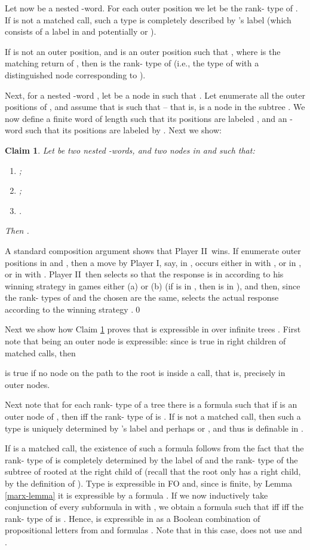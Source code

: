 \documentclass{LMCS}
\newcommand{\dupl}{Player II}
\newcommand{\spoiler}{Player I}
\newcommand{\sProof}[1]{\vspace{2mm}{\noindent\em Proof.~}#1\qed}
\theoremstyle{plain}
\newtheorem{claim}[theorem]{Claim}
\theoremstyle{definition}
\begin{document}
{Let  now be a nested -word. For each outer position 
we let  be the rank- type of . If  is not
a matched call, such a type is completely described by 's label
(which consists of a label in  and potentially  or
). 

If  is not
an outer position, and  is an outer position such that , where  is the matching return of , then  is
the rank- type of  (i.e., the type of
 with a distinguished node corresponding to ).

Next, for a nested -word , let  be a node in 
such that . Let  enumerate all the outer
positions of , and assume that  is such that  -- that is,  is a node in the subtree . We
now define a finite word  of length  such that
its positions  are labeled , and an -word  such that
its positions  are labeled by . Next we show:

\begin{claim}
\label{nwtl-comp-claim}
Let  be two nested -words, and 
two nodes in  and  such that:
\begin{enumerate}[\em(a)]
\item ;
\item ;
\item .
\end{enumerate}
Then .
\end{claim}

\sProof{A standard composition argument shows that \dupl\ wins. If 
enumerate outer positions in  and , then a
move by \spoiler, say, in , occurs either in  with
, or in , or in  with . \dupl\
then selects  so that the response is in  according
to his winning strategy in games either (a) or (b) (if  is in
, then  is in ), and then, since the
rank- types of  and the chosen  are the same,
selects the actual response according to the winning strategy
.}

Next we show how Claim \ref{nwtl-comp-claim} proves that  is
expressible in  over infinite trees . 
First note that being an outer node is expressible: since  is
true in right children of matched calls, then 

is true if no node on the path to the root is inside a call, that is,
precisely in outer nodes. 

Next note that for each rank- type  of a tree there is a 
formula  such that if  is an outer node of
, then  iff the rank- type of
 is . If  is not a matched call, then such a type is
uniquely determined by 's label and perhaps  or ,
and thus is definable in . 

If  is a matched call, the existence of such a formula  
follows from the fact that the rank- type of
 is completely determined by the label of  and the
rank- type  of the subtree  of  rooted
at the right child of  (recall that the root only has a right
child, by the definition of ). Type  is expressible in
FO and, since  is finite, by Lemma \ref{marx-lemma} it is
expressible by a  formula . If we now
inductively take conjunction of every subformula in 
with , we obtain  
a formula  such that 
 iff 
 iff 
the rank- type of  is
. 
Hence,  is expressible in  as a Boolean
combination of propositional letters from  and formulas . Note that in this case,  does not use
 and . 

}
\end{document}
